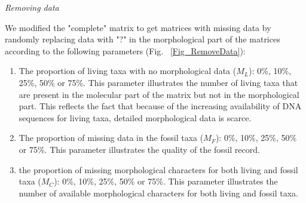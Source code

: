 \documentclass[12pt,letterpaper]{article}
\renewcommand{\subsection}[1]{%
\bigskip
\begin{center}
\begin{large}
\normalfont\itshape #1
\end{large}
\end{center}}
\begin{document}

\subsection{Removing data}
We modified the "complete" matrix to get matrices with missing data by randomly replacing data with "?" in the morphological part of the matrices according to the following parameters (Fig. ~\ref{Fig_RemoveData}):

\begin{enumerate}
\item{The proportion of living taxa with no morphological data ($M_{L}$): 0\%, 10\%, 25\%, 50\% or 75\%.}
This parameter illustrates the number of living taxa that are present in the molecular part of the matrix but not in the morphological part.
This reflects the fact that because of the increasing availability of DNA sequences for living taxa, detailed morphological data is scarce.
\item{The proportion of missing data in the fossil taxa ($M_{F}$): 0\%, 10\%, 25\%, 50\% or 75\%.}
This parameter illustrates the quality of the fossil record. 
\item{the proportion of missing morphological characters for both living and fossil taxa ($M_{C}$): 0\%, 10\%, 25\%, 50\% or 75\%. }
This parameter illustrates the number of available morphological characters for both living and fossil taxa.
\end{enumerate}
\end{document}
